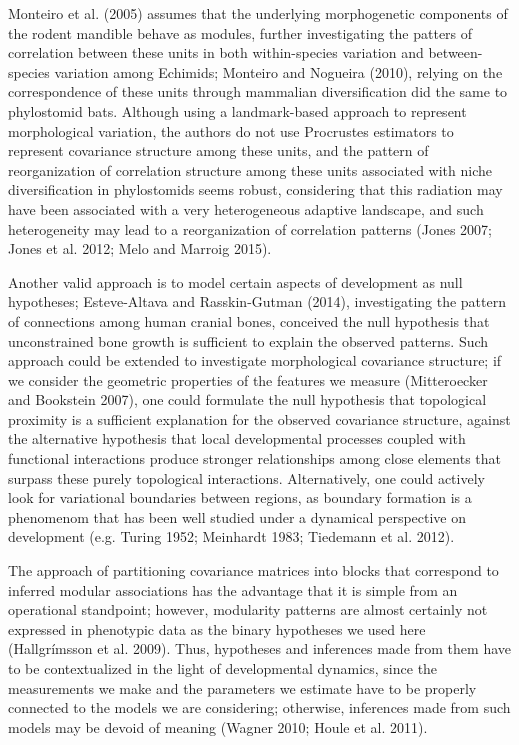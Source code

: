 \documentclass[12pt,]{article}
\begin{document}
Monteiro et al. (2005) assumes that the underlying morphogenetic
components of the rodent mandible behave as modules, further
investigating the patters of correlation between these units in both
within-species variation and between-species variation among Echimids;
Monteiro and Nogueira (2010), relying on the correspondence of these
units through mammalian diversification did the same to phylostomid
bats. Although using a landmark-based approach to represent
morphological variation, the authors do not use Procrustes estimators to
represent covariance structure among these units, and the pattern of
reorganization of correlation structure among these units associated
with niche diversification in phylostomids seems robust, considering
that this radiation may have been associated with a very heterogeneous
adaptive landscape, and such heterogeneity may lead to a reorganization
of correlation patterns (Jones 2007; Jones et al. 2012; Melo and Marroig
2015).

Another valid approach is to model certain aspects of development as
null hypotheses; Esteve-Altava and Rasskin-Gutman (2014), investigating
the pattern of connections among human cranial bones, conceived the null
hypothesis that unconstrained bone growth is sufficient to explain the
observed patterns. Such approach could be extended to investigate
morphological covariance structure; if we consider the geometric
properties of the features we measure (Mitteroecker and Bookstein 2007),
one could formulate the null hypothesis that topological proximity is a
sufficient explanation for the observed covariance structure, against
the alternative hypothesis that local developmental processes coupled
with functional interactions produce stronger relationships among close
elements that surpass these purely topological interactions.
Alternatively, one could actively look for variational boundaries
between regions, as boundary formation is a phenomenom that has been
well studied under a dynamical perspective on development (e.g. Turing
1952; Meinhardt 1983; Tiedemann et al. 2012).

The approach of partitioning covariance matrices into blocks that
correspond to inferred modular associations has the advantage that it is
simple from an operational standpoint; however, modularity patterns are
almost certainly not expressed in phenotypic data as the binary
hypotheses we used here (Hallgrímsson et al. 2009). Thus, hypotheses and
inferences made from them have to be contextualized in the light of
developmental dynamics, since the measurements we make and the
parameters we estimate have to be properly connected to the models we
are considering; otherwise, inferences made from such models may be
devoid of meaning (Wagner 2010; Houle et al. 2011).
\end{document}
